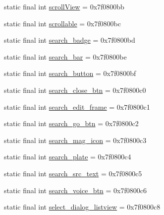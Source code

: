 \begin{DoxyCompactItemize}
\item 
static final int \mbox{\hyperlink{classandroid_1_1support_1_1design_1_1R_1_1id_a2de3dd9900590ae7787cfd98c2902697}{scroll\+View}} = 0x7f0800bb
\item 
static final int \mbox{\hyperlink{classandroid_1_1support_1_1design_1_1R_1_1id_a0a5991f478e0a41ee7785532f90a42c4}{scrollable}} = 0x7f0800bc
\item 
static final int \mbox{\hyperlink{classandroid_1_1support_1_1design_1_1R_1_1id_ab0e2b2d083c20f23f39c4fe0349968c3}{search\+\_\+badge}} = 0x7f0800bd
\item 
static final int \mbox{\hyperlink{classandroid_1_1support_1_1design_1_1R_1_1id_a0179560e777b05cd454e5ef1a4440d8a}{search\+\_\+bar}} = 0x7f0800be
\item 
static final int \mbox{\hyperlink{classandroid_1_1support_1_1design_1_1R_1_1id_ad73247be7f6a487b058f4d433c817d62}{search\+\_\+button}} = 0x7f0800bf
\item 
static final int \mbox{\hyperlink{classandroid_1_1support_1_1design_1_1R_1_1id_a5e6590cb31c93c114ae749b14d1755d2}{search\+\_\+close\+\_\+btn}} = 0x7f0800c0
\item 
static final int \mbox{\hyperlink{classandroid_1_1support_1_1design_1_1R_1_1id_ab4106953fa5afe73dbdda5b502b4b31f}{search\+\_\+edit\+\_\+frame}} = 0x7f0800c1
\item 
static final int \mbox{\hyperlink{classandroid_1_1support_1_1design_1_1R_1_1id_afceae185876ccb35a694edeebe51c5a6}{search\+\_\+go\+\_\+btn}} = 0x7f0800c2
\item 
static final int \mbox{\hyperlink{classandroid_1_1support_1_1design_1_1R_1_1id_a2aaecfd3a9dd6e4c3349e5f26561d0c7}{search\+\_\+mag\+\_\+icon}} = 0x7f0800c3
\item 
static final int \mbox{\hyperlink{classandroid_1_1support_1_1design_1_1R_1_1id_a718e248d6d7959bcfb7577c8a169160f}{search\+\_\+plate}} = 0x7f0800c4
\item 
static final int \mbox{\hyperlink{classandroid_1_1support_1_1design_1_1R_1_1id_a2359a86e57bfe8d942fd216893170d78}{search\+\_\+src\+\_\+text}} = 0x7f0800c5
\item 
static final int \mbox{\hyperlink{classandroid_1_1support_1_1design_1_1R_1_1id_af93508c1f5a72931efe0477e848c207f}{search\+\_\+voice\+\_\+btn}} = 0x7f0800c6
\item 
static final int \mbox{\hyperlink{classandroid_1_1support_1_1design_1_1R_1_1id_a8f804d5354b7fe1dbec4597297918e38}{select\+\_\+dialog\+\_\+listview}} = 0x7f0800c8
\item 

\end{DoxyCompactItemize}
